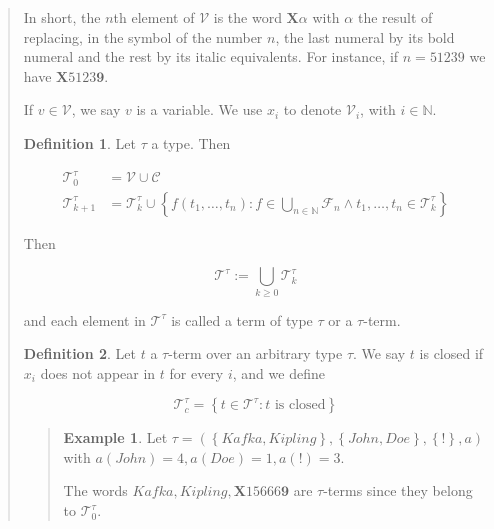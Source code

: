 \documentclass[a4paper, 12pt]{article}
\theoremstyle{definition}
\theoremstyle{definition}
\newtheorem{example}{Example}
\theoremstyle{definition}
\newtheorem{definition}{Definition}
\begin{document}
\begin{quote}
In short, the $n$th element of $\mathcal{V}$ is the word $\textbf{X}\alpha$ with $\alpha$
the result of replacing, in the symbol of the number $n$, the last numeral 
by its bold numeral and the rest by its italic equivalents. For instance, if 
$n = 51239$ we have $\textbf{X}\textit{5123}\textbf{9}$.

If $v \in \mathcal{V}$, we say $v$ is a variable. We use $x_i$ to denote $\mathcal{V}_{i}$,
with $i \in \mathbb{N}$.

\begin{definition}
    Let $\tau$ a type. Then 

    \begin{align*}
        \mathcal{T}_0^{\tau} &= \mathcal{V} \cup \mathcal{C} \\ 
        \mathcal{T}_{k+1}^{\tau} &= \mathcal{T}_k^{\tau} \cup \left\{ f(t_1, \ldots, t_n) : f \in \bigcup_{n\in \mathbb{N}} \mathcal{F}_n \land t_1,\ldots, t_n \in \mathcal{T}_k^{\tau} \right\} 
    \end{align*}

    Then 

    \begin{equation*}
        \mathcal{T}^{\tau} := \bigcup_{k\geq 0} \mathcal{T}_k^{\tau}
    \end{equation*}

    and each element in $\mathcal{T}^\tau$ is called a term of type $\tau$ or a $\tau$-term.
\end{definition}

\begin{definition}
    Let $t$ a $\tau$-term over an arbitrary type $\tau$. We say $t$ is closed if $x_i$ does not 
    appear in $t$ for every $i$, and we define 

    \begin{equation*}
        \mathcal{T}_c^{\tau} = \left\{ t \in \mathcal{T}^{\tau} : t \text{ is closed} \right\} 
    \end{equation*}
\end{definition}


\small
\begin{quote}

\begin{example}
    Let $\tau = \left( \left\{ Kafka, Kipling \right\}, \left\{ John, Doe \right\}, \left\{ ! \right\}, a    \right) $
    with $a(John) = 4, a(Doe) = 1, a(!) = 3$.

    The words $Kafka, Kipling, \textbf{X}\textit{15666}\textbf{9}$ are $\tau$-terms since 
    they belong to $\mathcal{T}_0^{\tau}$.


\end{example}
\end{quote}
\end{quote}
\end{document}
